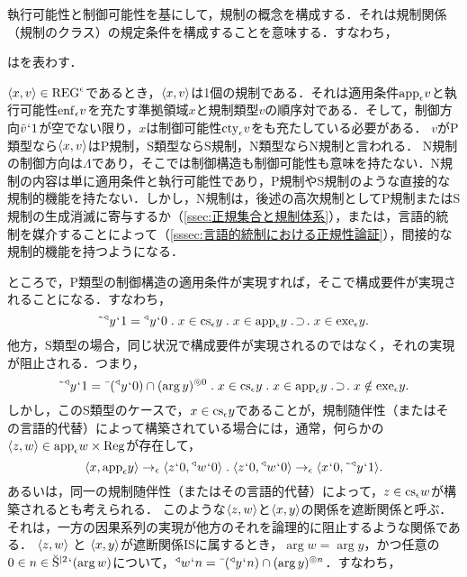 執行可能性と制御可能性を基にして，規制の概念を構成する．それは規制関係（規制のクラス）の規定条件を構成することを意味する．すなわち，
\begin{df}
\label{df:規制関係}
はを表わす．
\end{df}

\noindent $ \langle x,v \rangle\in\mathrm{REG}^\epsilon $であるとき，$\langle x,v \rangle$は1個の規制である．それは適用条件$\mathrm{app}_{\epsilon} v$と執行可能性$ \mathrm{enf}_{\epsilon}v $を充たす準拠領域$x$と規制類型$v$の順序対である．そして，制御方向$ \tilde{v}{\mspace{1mu}{`}\mspace{1mu}} 1 $が空でない限り，$ x $は制御可能性$ \mathrm{cty}_{\epsilon}v $をも充たしている必要がある．
$v$がP類型なら$\langle x,v \rangle$はP規制，S類型ならS規制，N類型ならN規制と言われる．
N規制の制御方向は$ \Lambda $であり，そこでは制御構造も制御可能性も意味を持たない．N規制の内容は単に適用条件と執行可能性であり，P規制やS規制のような直接的な規制的機能を持たない．しかし，N規制は，後述の高次規制としてP規制またはS規制の生成消滅に寄与するか（\ref{ssec:正規集合と規制体系}），または，言語的統制を媒介することによって（\ref{sssec:言語的統制における正規性論証}），間接的な規制的機能を持つようになる．

ところで，P類型の制御構造の適用条件が実現すれば，そこで構成要件が実現されることになる．すなわち，
\[
    \tildel{\trgl{y}}\fap 1 = \trgl{y}\fap 0\con{1}x\in \cs{\epsilon}y\con{1}x\in\app{\epsilon} y \case{1}{1}{1}x\in\exe{\epsilon} y.
\]
他方，S類型の場合，同じ状況で構成要件が実現されるのではなく，それの実現が阻止される．つまり，
\[
    \tildel{\trgl{y}}\fap 1 = \barl{(\trgl{y}\fap 0)}\cap\msec{(\arg y)}{0}\con{1}x\in \cs{\epsilon}y\con{1}x\in\app{\epsilon} y \case{1}{1}{1}x\notin\exe{\epsilon} y.
\]
しかし，このS類型のケースで，$ x\in \mathrm{cs}_{\epsilon}y $であることが，規制随伴性（またはその言語的代替）によって構築されている場合には，通常，何らかの$ \langle z,w \rangle\in \mathrm{app}_{\epsilon} w\times\mathrm{Reg} $が存在して，
\[
    \orp{x,\app{\epsilon} y}\to_{\epsilon}\orp{z\fap 0,\trgl{w}\fap 0}\con{1}
    \orp{z\fap 0,\trgl{w}\fap 0}\to_{\epsilon}\orp{x\fap 0,\tildel{\trgl{y}}\fap 1}.
\]
あるいは，同一の規制随伴性（またはその言語的代替）によって，$ z\in\mathrm{cs}_{\epsilon}w $が構築されるとも考えられる．
このような$ \langle z,w \rangle $と$ \langle x,y \rangle $の関係を遮断関係と呼ぶ．それは，一方の因果系列の実現が他方のそれを論理的に阻止するような関係である．
$ \langle z,w \rangle$ と $\langle x,y \rangle $が遮断関係$\mathrm{IS}$に属するとき，$ \arg w = \arg y $，かつ任意の$ 0\in n\in\breve{\mathrm{S}}^{\mid 2}{\mspace{1mu}{`}\mspace{1mu}}(\arg w) $について，$ {^\triangleleft}w{\mspace{1mu}{`}\mspace{1mu}} n = \bar{\:\:}({^\triangleleft}y{\mspace{1mu}{`}\mspace{1mu}} n)\cap(\arg y)^{\circledcirc n} $．すなわち，

